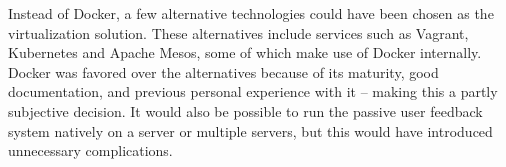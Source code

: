 Instead of Docker, a few alternative technologies could have been chosen as the virtualization solution.
These alternatives include services such as Vagrant, Kubernetes and Apache Mesos, some of which make use of Docker internally.
Docker was favored over the alternatives because of its maturity, good documentation, and previous personal experience with it -- making this a partly subjective decision.
It would also be possible to run the passive user feedback system natively on a server or multiple servers, but this would have introduced unnecessary complications.